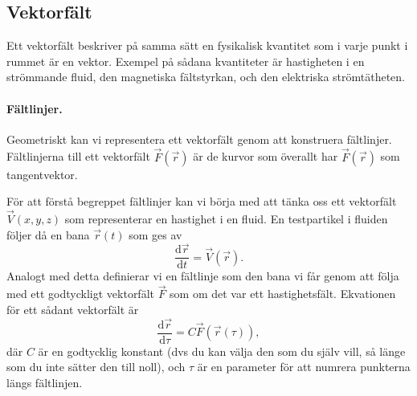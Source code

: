 \documentclass[%
oneside,                 %
final,                   %
10pt]{article}
\begin{document}
\vspace{6mm}



\subsection{Vektorfält}

Ett vektorfält beskriver på samma sätt en fysikalisk kvantitet som i varje punkt i rummet är en vektor.  Exempel på sådana kvantiteter är hastigheten i en strömmande fluid, den magnetiska fältstyrkan, och den elektriska strömtätheten.  

\paragraph{Fältlinjer.}
Geometriskt kan vi representera ett vektorfält genom att konstruera fältlinjer. Fältlinjerna till ett vektorfält $\vec{F}(\vec{r})$ är de kurvor som överallt har $\vec{F}(\vec{r})$ som tangentvektor. 

För att förstå begreppet fältlinjer kan vi börja med att tänka oss ett vektorfält $\vec{V}(x,y,z)$ som representerar en hastighet i en fluid.  En testpartikel i fluiden följer då en bana $\vec{r}(t)$ som ges av
\begin{equation}
  \frac{\mbox{d}\vec{r}}{\mbox{d}t} = \vec{V}\left(\vec{r}\right).
\end{equation}
Analogt med detta definierar vi en fältlinje som den bana vi får genom att följa med ett godtyckligt vektorfält $\vec{F}$ som om det var ett hastighetsfält.  Ekvationen för ett sådant vektorfält är
\begin{equation}
  \frac{\mbox{d}\vec{r}}{\mbox{d}\tau} = C \vec{F}\left(\vec{r}(\tau)\right),
\end{equation}
där $C$ är en godtycklig konstant (dvs du kan välja den som du själv 
vill, så länge som du inte sätter den till noll), och $\tau$ är en
parameter för att numrera punkterna längs fältlinjen.
\end{document}
